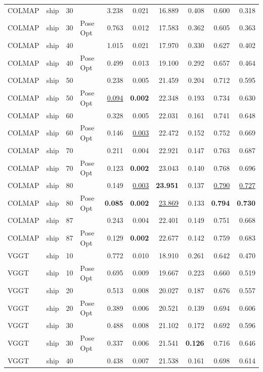 \begin{table}[H]
\begin{tabular}{llrlrrrrrr}
COLMAP & ship & 30 &  & 3.238 & 0.021 & 16.889 & 0.408 & 0.600 & 0.318 \\
COLMAP & ship & 30 & Pose Opt & 0.763 & 0.012 & 17.583 & 0.362 & 0.605 & 0.363 \\
COLMAP & ship & 40 &  & 1.015 & 0.021 & 17.970 & 0.330 & 0.627 & 0.402 \\
COLMAP & ship & 40 & Pose Opt & 0.499 & 0.013 & 19.100 & 0.292 & 0.657 & 0.464 \\
COLMAP & ship & 50 &  & 0.238 & 0.005 & 21.459 & 0.204 & 0.712 & 0.595 \\
COLMAP & ship & 50 & Pose Opt & \underline{0.094} & \textbf{0.002} & 22.348 & 0.193 & 0.734 & 0.630 \\
COLMAP & ship & 60 &  & 0.328 & 0.005 & 22.031 & 0.161 & 0.741 & 0.648 \\
COLMAP & ship & 60 & Pose Opt & 0.146 & \underline{0.003} & 22.472 & 0.152 & 0.752 & 0.669 \\
COLMAP & ship & 70 &  & 0.211 & 0.004 & 22.921 & 0.147 & 0.763 & 0.687 \\
COLMAP & ship & 70 & Pose Opt & 0.123 & \textbf{0.002} & 23.043 & 0.140 & 0.768 & 0.696 \\
COLMAP & ship & 80 &  & 0.149 & \underline{0.003} & \textbf{23.951} & 0.137 & \underline{0.790} & \underline{0.727} \\
COLMAP & ship & 80 & Pose Opt & \textbf{0.085} & \textbf{0.002} & \underline{23.869} & 0.133 & \textbf{0.794} & \textbf{0.730} \\
COLMAP & ship & 87 &  & 0.243 & 0.004 & 22.401 & 0.149 & 0.751 & 0.668 \\
COLMAP & ship & 87 & Pose Opt & 0.129 & \textbf{0.002} & 22.677 & 0.142 & 0.759 & 0.683 \\
VGGT & ship & 10 &  & 0.772 & 0.010 & 18.910 & 0.261 & 0.642 & 0.470 \\
VGGT & ship & 10 & Pose Opt & 0.695 & 0.009 & 19.667 & 0.223 & 0.660 & 0.519 \\
VGGT & ship & 20 &  & 0.513 & 0.008 & 20.027 & 0.187 & 0.676 & 0.557 \\
VGGT & ship & 20 & Pose Opt & 0.389 & 0.006 & 20.521 & 0.139 & 0.694 & 0.606 \\
VGGT & ship & 30 &  & 0.488 & 0.008 & 21.102 & 0.172 & 0.692 & 0.596 \\
VGGT & ship & 30 & Pose Opt & 0.337 & 0.006 & 21.541 & \textbf{0.126} & 0.716 & 0.646 \\
VGGT & ship & 40 &  & 0.438 & 0.007 & 21.538 & 0.161 & 0.698 & 0.614 \\

\end{tabular}
\end{table}
